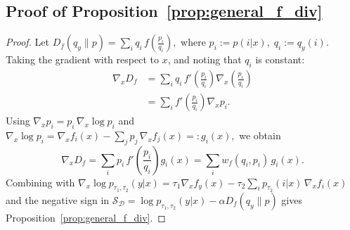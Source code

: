 \documentclass{article}
\begin{document}
\subsection{Proof of Proposition~\ref{prop:general_f_div}}
\label{app:proof_general}

\begin{proof}
Let $D_f(q_y\|p)=\sum_{i} q_i\, f\!\left(\frac{p_i}{q_i}\right),
$ where $ p_i := p(i|x),\; q_i := q_y(i).$
Taking the gradient with respect to $x$, and noting that $q_i$ is constant:
\begin{align}
\nabla_x D_f
&= \sum_i q_i\, f'\!\left(\frac{p_i}{q_i}\right) \nabla_x\!\left(\frac{p_i}{q_i}\right) \nonumber\\
&= \sum_i f'\!\left(\frac{p_i}{q_i}\right) \nabla_x p_i.
\label{eq:pf1}
\end{align}
Using $\nabla_x p_i = p_i\,\nabla_x\log p_i$ and $\nabla_x \log p_i
= \nabla_x f_i(x) - \sum_j p_j\, \nabla_x f_j(x) =: g_i(x),$ we obtain
\begin{equation}
\nabla_x D_f
= \sum_i p_i\, f'\!\left(\frac{p_i}{q_i}\right) g_i(x)
= \sum_i w_f(q_i,p_i)\, g_i(x).
\label{eq:pf2}
\end{equation}
Combining with $\nabla_x \log p_{\tau_1,\tau_2}(y|x) = \tau_1 \nabla_x f_y(x) - \tau_2 \sum_i p_{\tau_2}(i|x)\,\nabla_x f_i(x)$
and the negative sign in $\mathcal{S}_{\mathcal{D}} = \log p_{\tau_1,\tau_2}(y|x) - \alpha D_f(q_y\|p)$
gives Proposition~\ref{prop:general_f_div}.
\end{proof}
\end{document}
